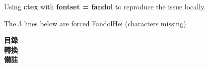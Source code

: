 \documentclass[fontset = none]{book}
\begin{document}
    Using \textbf{ctex} with \textbf{fontset = fandol} to reproduce the issue locally.\newline

    The 3 lines below are forced FandolHei (characters missing).\newline

    \textbf{目錄}\\

    \textbf{轉換}\\

    \textbf{備註}\\
\end{document}
